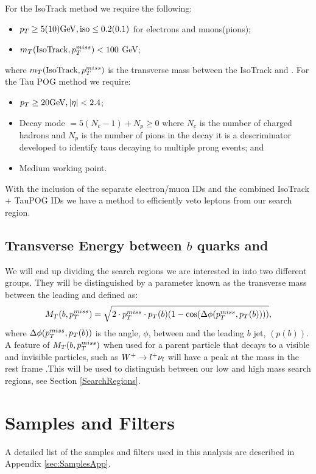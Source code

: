 For the IsoTrack method we require the following:
\begin{itemize}
	\item $p_{T}\geq5(10) \text{GeV}, \text{iso}\leq0.2(0.1)$ for electrons and muons(pions);
	\item $m_T(\text{IsoTrack},p_{T}^{miss})<100$ GeV;
\end{itemize}
where $m_T(\text{IsoTrack},p_{T}^{miss})$ is the transverse mass between the IsoTrack and \met. For the Tau POG method we require:
\begin{itemize}
	\item $p_{T}\geq20 \text{GeV}, |\eta|<2.4$;
	\item Decay mode $=5(N_c-1)+N_p\geq0$ where $N_c$ is the number of charged hadrons and $N_p$ is the number of pions in the decay it is a descriminator developed to identify taus decaying to multiple prong events; and
	\item Medium working point.
\end{itemize}
With the inclusion of the separate electron/muon IDs and the combined IsoTrack + TauPOG IDs we have a method to efficiently veto leptons from our search region.

\subsection{Transverse Energy between $b$ quarks and \met} \label{sec:transverseMass}
We will end up dividing the search regions we are interested in into two different groups. They will be distinguished by a parameter known as the transverse mass between the leading \bjet{} and \met{} defined as:
\begin{equation}\label{TransverseMass}
M_T(b,p_{T}^{miss})=\sqrt{2\cdot p_{T}^{miss}\cdot p_{T}(b)(1-\cos(\Delta\phi(p_{T}^{miss},p_{T}(b))))},
\end{equation}
where $\Delta\phi(p_{T}^{miss},p_{T}(b))$ is the angle, $\phi$, between \met and the leading $b$ jet, $(p(b))$. A feature of $M_T(b,p_{T}^{miss})$ when used for a parent particle that decays to a visible and invisible particles, such as $W^+\rightarrow l^+\nu_l$ will have a peak at the \W{} mass in the rest frame \cite{tovey_transformation_2019}.This will be used to distinguish between our low and high mass search regions, see Section \ref{SearchRegions}.

\section{Samples and Filters}\label{Samples}
A detailed list of the samples and filters used in this analysis are described in Appendix \ref{sec:SamplesApp}.

